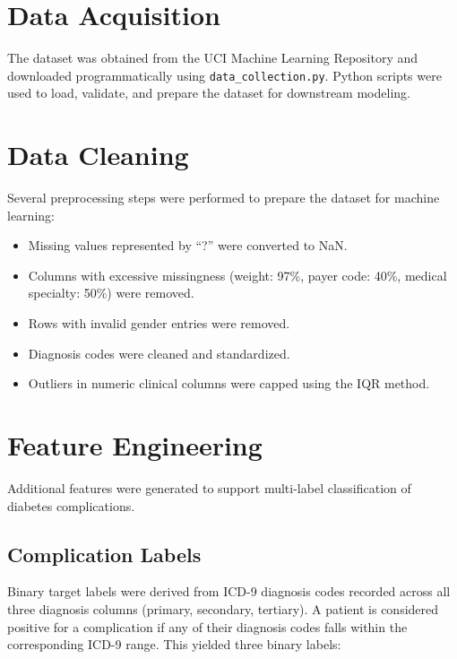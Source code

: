 \documentclass[12pt]{article}
\begin{document}
\section{Data Acquisition}

The dataset was obtained from the UCI Machine Learning Repository and downloaded
programmatically using \texttt{data\_collection.py}. Python scripts were used to load,
validate, and prepare the dataset for downstream modeling.


\section{Data Cleaning}

Several preprocessing steps were performed to prepare the dataset for machine learning:

\begin{itemize}
  \item Missing values represented by ``?'' were converted to NaN.
  \item Columns with excessive missingness (weight: 97\%, payer code: 40\%,
        medical specialty: 50\%) were removed.
  \item Rows with invalid gender entries were removed.
  \item Diagnosis codes were cleaned and standardized.
  \item Outliers in numeric clinical columns were capped using the IQR method.
\end{itemize}


\section{Feature Engineering}

Additional features were generated to support multi-label classification of diabetes
complications.

\subsection{Complication Labels}

Binary target labels were derived from ICD-9 diagnosis codes recorded across all three
diagnosis columns (primary, secondary, tertiary). A patient is considered positive for a
complication if any of their diagnosis codes falls within the corresponding ICD-9 range.
This yielded three binary labels:
\end{document}

